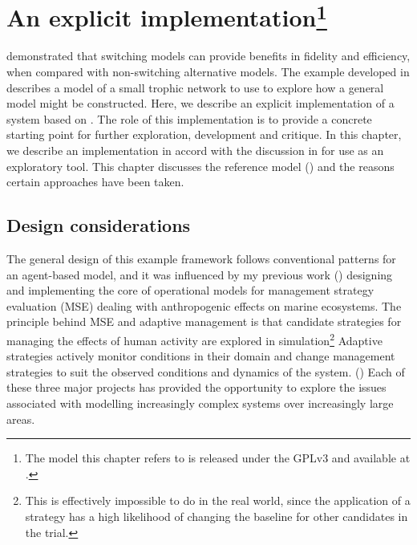 

\chapter[AN EXPLICIT IMPLEMENTATION]{An explicit
implementation\footnote{The model this chapter refers to is released
under the GPLv3 and available at \repos.}}
\WeAreOn{\cfive}\label{explicitmodel}


\Ctwo demonstrated that switching models can provide benefits in
fidelity and efficiency, when compared with non-switching alternative
models.  The example developed in \Cthree describes a model of a small
trophic network to use to explore how a general model might be
constructed. Here, we describe an explicit implementation of a system
based on \Cthree. The role of this implementation is to provide a
concrete starting point for further exploration, development and
critique.  In this chapter, we describe an implementation in accord
with the discussion in \Cthree for use as an exploratory tool.  This
chapter discusses the reference model (\ReModel) and the
reasons certain approaches have been taken.

\section{Design considerations}
The general design of this example framework follows conventional
patterns for an agent-based model, and it was influenced by my
previous work (\cite{lyne1994pmez5, gray2006nws, gray2014}) designing
and implementing the core of operational models for management
strategy evaluation (MSE) dealing with anthropogenic effects on
marine ecosystems.  The principle behind MSE and adaptive management
is that candidate strategies for managing the effects of human
activity are explored in simulation\footnote{This is effectively
  impossible to do in the real world, since the application of a
  strategy has a high likelihood of changing the baseline for other
  candidates in the trial.} Adaptive strategies actively monitor
conditions in their domain and change management strategies to suit
the observed conditions and dynamics of the
system. (\cite{walters1976,smith1993,polacheck1999,sainsbury2000,keith2011})
Each of these three major projects has provided the opportunity to
explore the issues associated with modelling increasingly complex
systems over increasingly large areas.

